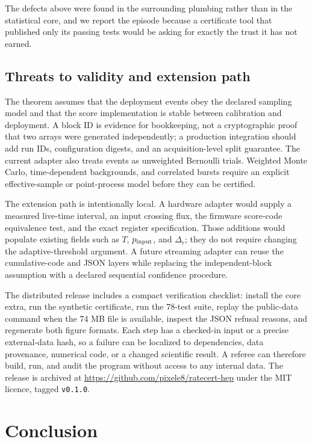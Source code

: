 \documentclass[preprint,12pt]{elsarticle}
\begin{document}
The defects above were found in the surrounding plumbing rather than in the
statistical core, and we report the episode because a certificate tool that
published only its passing tests would be asking for exactly the trust it has
not earned.

\subsection{Threats to validity and extension path}

The theorem assumes that the deployment events obey the declared sampling model
and that the score implementation is stable between calibration and
deployment.  A block ID is evidence for bookkeeping, not a cryptographic proof
that two arrays were generated independently; a production integration should
add run IDs, configuration digests, and an acquisition-level split guarantee.
The current adapter also treats events as unweighted Bernoulli trials.  Weighted
Monte Carlo, time-dependent backgrounds, and correlated bursts require an
explicit effective-sample or point-process model before they can be certified.

The extension path is intentionally local.  A hardware adapter would supply a
measured live-time interval, an input crossing flux, the firmware score-code
equivalence test, and the exact register specification.  Those additions would
populate existing fields such as $T$, $p_{\rm input}$, and $\Delta_r$; they do
not require changing the adaptive-threshold argument.  A future streaming
adapter can reuse the cumulative-code and JSON layers while replacing the
independent-block assumption with a declared sequential confidence procedure.

The distributed release includes a compact verification checklist: install the
core extra, run the synthetic certificate, run the 78-test suite, replay the
public-data command when the 74 MB file is available, inspect the JSON refusal
reasons, and regenerate both figure formats.  Each step has a checked-in input
or a precise external-data hash, so a failure can be localized to dependencies,
data provenance, numerical code, or a changed scientific result.  A referee can
therefore build, run, and audit the program without access to any internal data.
The release is archived at \url{https://github.com/pixele8/ratecert-hep} under
the MIT licence, tagged \texttt{v0.1.0}.

\section{Conclusion}
\label{sec:conclusion}
\end{document}
